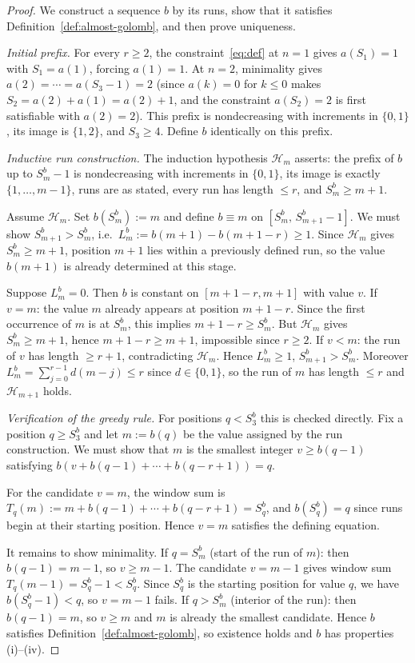 \documentclass[12pt]{article}
\theoremstyle{definition}
\theoremstyle{remark}
\begin{document}
\begin{proof}
We construct a sequence $b$ by its runs, show that it satisfies
Definition~\ref{def:almost-golomb}, and then prove uniqueness.

\textit{Initial prefix.}
For every $r\ge 2$, the constraint~\eqref{eq:def} at $n=1$ gives $a(S_1)=1$
with $S_1=a(1)$, forcing $a(1)=1$.
At $n=2$, minimality gives $a(2)=\cdots=a(S_3-1)=2$
(since $a(k)=0$ for $k\le 0$ makes $S_2=a(2)+a(1)=a(2)+1$,
and the constraint $a(S_2)=2$ is first satisfiable with $a(2)=2$).
This prefix is nondecreasing with increments in $\{0,1\}$, its image is
$\{1,2\}$, and $S_3\ge 4$.
Define $b$ identically on this prefix.

\textit{Inductive run construction.}
The induction hypothesis $\mathcal H_m$ asserts: the prefix of $b$
up to $S_m^b-1$ is nondecreasing with increments in $\{0,1\}$,
its image is exactly $\{1,\ldots,m-1\}$, runs are as stated,
every run has length $\le r$, and $S_m^b\ge m+1$.

Assume $\mathcal H_m$. Set $b(S_m^b):=m$ and define $b\equiv m$ on
$[S_m^b,\,S_{m+1}^b-1]$. We must show $S_{m+1}^b>S_m^b$,
i.e.\ $L_m^b:=b(m+1)-b(m+1-r)\ge 1$.
Since $\mathcal H_m$ gives $S_m^b\ge m+1$, position $m+1$ lies within
a previously defined run, so the value $b(m+1)$ is already determined
at this stage.

Suppose $L_m^b=0$. Then $b$ is constant on $[m+1-r,m+1]$ with value $v$.
If $v=m$: the value $m$ already appears at position $m+1-r$.
Since the first occurrence of $m$ is at $S_m^b$, this implies $m+1-r\ge S_m^b$.
But $\mathcal H_m$ gives $S_m^b\ge m+1$, hence $m+1-r\ge m+1$, impossible since $r\ge 2$.
If $v<m$: the run of $v$ has length $\ge r+1$, contradicting $\mathcal H_m$.
Hence $L_m^b\ge 1$, $S_{m+1}^b>S_m^b$.
Moreover $L_m^b=\sum_{j=0}^{r-1}d(m-j)\le r$ since $d\in\{0,1\}$,
so the run of $m$ has length $\le r$ and $\mathcal H_{m+1}$ holds.

\textit{Verification of the greedy rule.}
For positions $q<S_3^b$ this is checked directly.
Fix a position $q\ge S_3^b$ and let $m:=b(q)$ be the value assigned by
the run construction. We must show that $m$ is the smallest integer
$v\ge b(q-1)$ satisfying $b(v+b(q-1)+\cdots+b(q-r+1))=q$.

For the candidate $v=m$, the window sum is
$T_q(m):=m+b(q-1)+\cdots+b(q-r+1)=S_q^b$, and $b(S_q^b)=q$ since
runs begin at their starting position. Hence $v=m$ satisfies the defining equation.

It remains to show minimality.
If $q=S_m^b$ (start of the run of $m$): then $b(q-1)=m-1$, so $v\ge m-1$.
The candidate $v=m-1$ gives window sum $T_q(m-1)=S_q^b-1<S_q^b$.
Since $S_q^b$ is the starting position for value $q$, we have $b(S_q^b-1)<q$,
so $v=m-1$ fails.
If $q>S_m^b$ (interior of the run): then $b(q-1)=m$, so $v\ge m$ and
$m$ is already the smallest candidate.
Hence $b$ satisfies Definition~\ref{def:almost-golomb}, so existence holds
and $b$ has properties (i)--(iv).


\end{proof}
\end{document}
